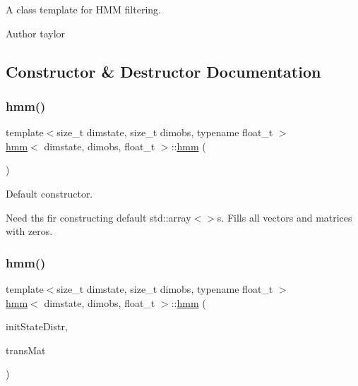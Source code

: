 A class template for H\+MM filtering. 

\begin{DoxyAuthor}{Author}
taylor 
\end{DoxyAuthor}


\subsection{Constructor \& Destructor Documentation}
\mbox{\label{classhmm_ad3dc1fd2d297d6da8c58b2d5075e561c}} 
\subsubsection{\texorpdfstring{hmm()}{hmm()}\hspace{0.1cm}{\footnotesize\ttfamily [1/2]}}
{\footnotesize\ttfamily template$<$size\+\_\+t dimstate, size\+\_\+t dimobs, typename float\+\_\+t $>$ \\
\hyperlink{classhmm}{hmm}$<$ dimstate, dimobs, float\+\_\+t $>$\+::\hyperlink{classhmm}{hmm} (\begin{DoxyParamCaption}{ }\end{DoxyParamCaption})}



Default constructor. 

Need ths fir constructing default std\+::array$<$$>$s. Fills all vectors and matrices with zeros. \mbox{\label{classhmm_a51696b4e5a92c56c589b5e9522115994}} 
\subsubsection{\texorpdfstring{hmm()}{hmm()}\hspace{0.1cm}{\footnotesize\ttfamily [2/2]}}
{\footnotesize\ttfamily template$<$size\+\_\+t dimstate, size\+\_\+t dimobs, typename float\+\_\+t $>$ \\
\hyperlink{classhmm}{hmm}$<$ dimstate, dimobs, float\+\_\+t $>$\+::\hyperlink{classhmm}{hmm} (\begin{DoxyParamCaption}\item[{const \hyperlink{classcf__filter_ad4bce534d6b7a494dae851846037c94b}{ssv} \&}]{init\+State\+Distr,  }\item[{const \hyperlink{classhmm_ab954b8e3fc86a60201ec33f371a241aa}{ss\+Mat} \&}]{trans\+Mat }\end{DoxyParamCaption})}



